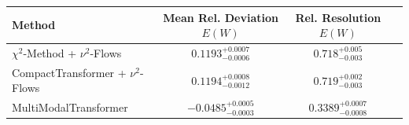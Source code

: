     \begin{tabular}{lccc}
        \toprule
        Method & Mean Rel. Deviation $E(W)$ & Rel. Resolution $E(W)$ \\
        \midrule
        $\chi^2$-Method + $\nu^2$-Flows & $0.1193^{+0.0007}_{-0.0006}$ & $0.718^{+0.005}_{-0.003}$ \\
        CompactTransformer + $\nu^2$-Flows & $0.1194^{+0.0008}_{-0.0012}$ & $0.719^{+0.002}_{-0.003}$ \\
        MultiModalTransformer & $-0.0485^{+0.0005}_{-0.0003}$ & $0.3389^{+0.0007}_{-0.0008}$ \\
        \bottomrule
    \end{tabular}